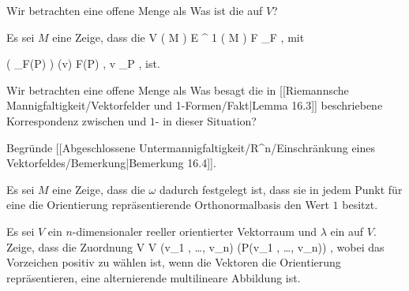 {}
{

Wir betrachten eine offene Menge
 als
 Was ist die
 auf $V$?

}
{} {}

{}
{

Es sei $M$ eine
Zeige, dass die
\maabbeledisp {} {
{ \mathcal V } ( M )  } {
{ \mathcal E }^{  1 } (  M   )
} { F } { \omega_F
} {,}
mit

\mavergleichskettedisp
{\vergleichskette
{ \left(  \omega_F(P)  \right) (v)
}
{ } { \left\langle F(P) , v  \right\rangle_P
}
{ } {
}
{ } {
}
{ } {
}
}
{}{}{,}
ist.

}
{} {}

{}
{

Wir betrachten eine offene Menge
 als
 Was besagt die in
[[Riemannsche Mannigfaltigkeit/Vektorfelder und 1-Formen/Fakt|Lemma 16.3]] beschriebene Korrespondenz zwischen
und
$1$- in dieser Situation?

}
{} {}

{}
{

Begründe
[[Abgeschlossene Untermannigfaltigkeit/R^n/Einschränkung eines Vektorfeldes/Bemerkung|Bemerkung 16.4]].

}
{} {}

{}
{

Es sei $M$ eine
 Zeige, dass die
 $\omega$ dadurch festgelegt ist, dass sie in jedem Punkt für eine die Orientierung repräsentierende Orthonormalbasis den Wert $1$ besitzt.

}
{} {}

{}
{

Es sei $V$ ein $n$-dimensionaler reeller orientierter Vektorraum und $\lambda$ ein
auf $V$. Zeige, dass die Zuordnung
\maabbeledisp {} {V \times \cdots \times V} {\R
} {(v_1 , \ldots , v_n) } { \pm \lambda (P(v_1 , \ldots , v_n))
} {,}
wobei das Vorzeichen positiv zu wählen ist, wenn die Vektoren die Orientierung repräsentieren, eine alternierende multilineare Abbildung ist.

}
{} {}

